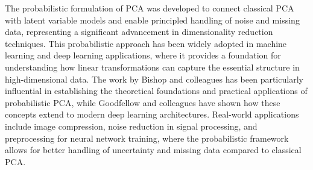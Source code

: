 The probabilistic formulation of PCA was developed to connect classical PCA with latent variable models and enable principled handling of noise and missing data, representing a significant advancement in dimensionality reduction techniques. This probabilistic approach has been widely adopted in machine learning and deep learning applications, where it provides a foundation for understanding how linear transformations can capture the essential structure in high-dimensional data. The work by Bishop and colleagues has been particularly influential in establishing the theoretical foundations and practical applications of probabilistic PCA, while Goodfellow and colleagues have shown how these concepts extend to modern deep learning architectures. Real-world applications include image compression, noise reduction in signal processing, and preprocessing for neural network training, where the probabilistic framework allows for better handling of uncertainty and missing data compared to classical PCA.
